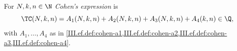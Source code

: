 For $N,k,n\in\N$ \emph{Cohen's expression} is
\[
  \TC(N,k,n)=A_1(N,k,n)+A_2(N,k,n)+A_3(N,k,n)+A_4(k,n)\in\Q,
\]
with $A_1,\dots,A_4$ as in \cref{III.ef.def:cohen-a1,III.ef.def:cohen-a2,III.ef.def:cohen-a3,III.ef.def:cohen-a4}.
